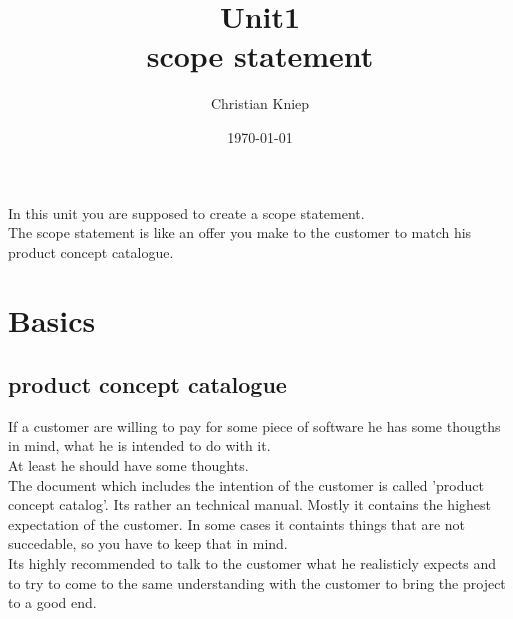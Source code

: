 \documentclass[11pt]{article}
\author{Christian Kniep}
\title{Unit1 \\ scope statement}
\date{\today}
\begin{document}
\maketitle
In this unit you are supposed to create a scope statement.\\
The scope statement is like an offer you make to the customer to match his product concept catalogue.
\section{Basics}
\subsection{product concept catalogue}
If a customer are willing to pay for some piece of software he has some thougths in mind,
what he is intended to do with it.\\
At least he should have some thoughts.\\
The document which includes the intention of the customer is called 'product concept catalog'. Its rather an technical manual.
Mostly it contains the highest expectation of the customer. In some cases it containts things that are not succedable, so you have to keep that in mind. \\
Its highly recommended to talk to the customer what he realisticly expects and to try to come to the same understanding with the customer to bring the project to a good end.
\end{document}
